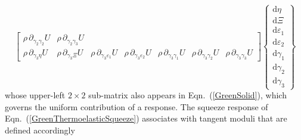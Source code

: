 \begin{equation}
\begin{bmatrix}
\rho \, \partial_{\gamma_2\gamma_2} U &
\rho \, \partial_{\gamma_2\gamma_3} U \\
\rho \, \partial_{\gamma_3\eta} U & 
\rho \, \partial_{\gamma_3\Xi} U & 
\rho \, \partial_{\gamma_3\varepsilon_1} U & 
\rho \, \partial_{\gamma_3\varepsilon_2} U &
\rho \, \partial_{\gamma_3\gamma_1} U  &
\rho \, \partial_{\gamma_3\gamma_2} U &
\rho \, \partial_{\gamma_3\gamma_3} U
\end{bmatrix}
\left\{ \begin{matrix}
\mathrm{d}\eta \\ \mathrm{d} \Xi \\
\mathrm{d} \varepsilon_1 \\ \mathrm{d} \varepsilon_2 \\
\mathrm{d} \gamma_1 \\ \mathrm{d} \gamma_2 \\ \mathrm{d} \gamma_3
\end{matrix} \right\}
\label{energies3D}
\end{equation}
whose upper-left $2\times 2$ sub-matrix also appears in Eqn.~(\ref{GreenSolid}), which governs the uniform contribution of a response.  The squeeze response of Eqn.~(\ref{GreenThermoelasticSqueeze}) associates with tangent moduli that are defined accordingly
